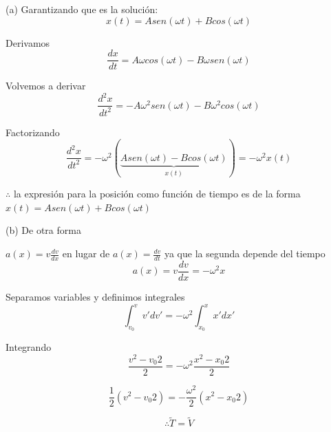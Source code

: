 \documentclass[a4paper,11pt]{scrartcl}
\begin{document}
\begin{center}

(a) Garantizando que es la solución:\\

\begin{equation}
x(t) = A sen ( \omega t ) + B cos ( \omega t )
\end{equation}

Derivamos\\

\begin{equation}
\frac{dx}{dt} = A \omega cos ( \omega t ) - B \omega sen ( \omega t )
\end{equation}

Volvemos a derivar\\

\begin{equation}
\frac{d^{2}x}{dt^{2}} = - A \omega^{2} sen ( \omega t ) - B \omega^{2} cos ( \omega t )
\end{equation}

Factorizando\\

\begin{equation}
\frac{d^{2}x}{dt^{2}} = - \omega^{2} (\underbrace{A sen ( \omega t ) - B cos ( \omega t )}_{{x(t)}}) = - \omega^{2}x(t)
\end{equation}

$\therefore$ la expresión para la posición como función de tiempo es de la forma $x(t) = A sen ( \omega t ) + B cos ( \omega t )$\\

\hfill \break

(b) De otra forma\\

\hfill \break

$a(x) = v\frac{dv}{dx}$ en lugar de $a(x) = \frac{dv}{dt}$ ya que la segunda depende del tiempo\\

\begin{equation}
a(x) = v\frac{dv}{dx} = - \omega^{2}x
\end{equation}

Separamos variables y definimos integrales\\

\begin{equation}
\int_{v_0}^{v} v' dv' = - \omega^{2} \int_{x_0}^{x} x' dx'
\end{equation}

Integrando\\

\begin{equation}
\frac{v^{2}-v_0{2}}{2} = - \omega^{2} \frac{x^{2}-x_0{2}}{2}
\end{equation}

\begin{equation}
\frac{1}{2}(v^{2}-v_0{2}) = - \frac{\omega^{2}}{2}(x^{2}-x_0{2})
\end{equation}

\begin{equation}
\therefore \widetilde{T} = \widetilde{V}
\end{equation}
 
\end{center}
\end{document}
